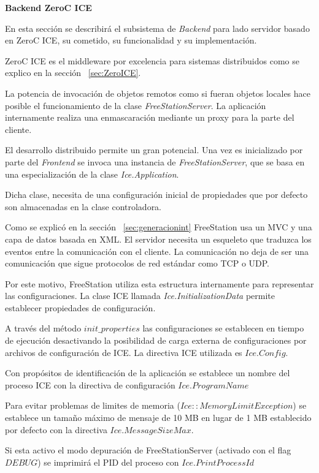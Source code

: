 \textbf{Backend ZeroC ICE}

En esta sección se describirá el subsistema de \emph{Backend} para lado servidor
basado en ZeroC ICE, su cometido, su funcionalidad y su implementación.

ZeroC ICE es el middleware por excelencia para sistemas distribuidos como se
explico en la sección ~\ref{sec:ZeroICE}.

La potencia de invocación de objetos remotos como si fueran objetos locales hace
posible el funcionamiento de la clase \emph{FreeStationServer}. La aplicación
internamente realiza una enmascaración mediante un proxy para la parte del
cliente.

El desarrollo distribuido permite un gran potencial. Una vez es inicializado
por parte del \emph{Frontend} se invoca una instancia de
\emph{FreeStationServer}, que se basa en una especialización de la clase \emph{Ice.Application}.

Dicha clase, necesita de una configuración inicial de propiedades que por 
defecto son almacenadas en la clase controladora.

Como se explicó en la sección ~\ref{sec:generacionint} FreeStation usa un MVC y
una capa de datos basada en XML. El servidor necesita un esqueleto que
traduzca los eventos entre la comunicación con el cliente. La comunicación no
deja de ser una comunicación que sigue protocolos de red estándar como TCP o UDP.

Por este motivo, FreeStation utiliza esta estructura internamente para
representar las configuraciones. La clase ICE llamada
\emph{Ice.InitializationData} permite establecer propiedades de configuración.

A través del método $init\_properties$ las configuraciones se establecen en
tiempo de ejecución desactivando la posibilidad de carga externa de 
configuraciones por archivos de configuración de
ICE. La directiva ICE utilizada es $Ice.Config$.

Con propósitos de identificación de la aplicación se establece un nombre del
proceso ICE con la directiva de configuración $Ice.ProgramName$

Para evitar problemas de limites de memoria ($Ice::MemoryLimitException$) se
establece un tamaño máximo de mensaje de 10 MB en lugar de 1 MB establecido por
defecto con la directiva $Ice.MessageSizeMax$.

Si esta activo el modo depuración de FreeStationServer (activado con el flag
$DEBUG$) se imprimirá el PID del proceso con $Ice.PrintProcessId$

